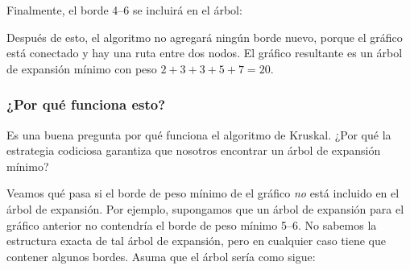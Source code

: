 \begin{samepage}
Finalmente, el borde 4--6 se incluirá en el árbol:

\begin{center}
\end{center}
\end{samepage}

Después de esto, el algoritmo no agregará ningún
borde nuevo, porque el gráfico está conectado
y hay una ruta entre dos nodos.
El gráfico resultante es un árbol de expansión mínimo
con peso $2+3+3+5+7=20$.

\subsubsection{¿Por qué funciona esto?}

Es una buena pregunta por qué funciona el algoritmo de Kruskal.
¿Por qué la estrategia codiciosa garantiza que nosotros
encontrar un árbol de expansión mínimo?

Veamos qué pasa si el borde de peso mínimo de
el gráfico \emph{no} está incluido en el árbol de expansión.
Por ejemplo, supongamos que un árbol de expansión
para el gráfico anterior no contendría el
borde de peso mínimo 5--6.
No sabemos la estructura exacta de tal árbol de expansión,
pero en cualquier caso tiene que contener algunos bordes.
Asuma que el árbol sería como sigue:

\begin{center}
\end{center}


